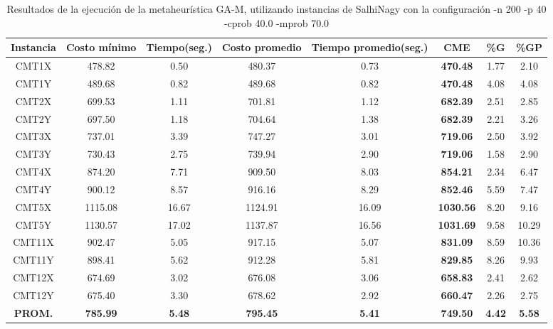 \begin{table}[h]
\caption{Resultados de la ejecución de la metaheurística GA-M, utilizando instancias de SalhiNagy con la configuración -n 200 -p 40 -cprob 40.0 -mprob 70.0}
\centering
\small
\begin{tabular}{c c c c c c c c}
\hline\hline
Instancia & Costo mínimo & Tiempo(seg.) & Costo promedio & Tiempo promedio(seg.) & CME & \%G & \%GP \\ [0.5ex]
\hline
CMT1X & 478.82 & 0.50 & 
480.37 & 0.73 & \bf{470.48} & 
1.77 & 2.10\\CMT1Y & 489.68 & 0.82 & 
489.68 & 0.82 & \bf{470.48} & 
4.08 & 4.08\\CMT2X & 699.53 & 1.11 & 
701.81 & 1.12 & \bf{682.39} & 
2.51 & 2.85\\CMT2Y & 697.50 & 1.18 & 
704.64 & 1.38 & \bf{682.39} & 
2.21 & 3.26\\CMT3X & 737.01 & 3.39 & 
747.27 & 3.01 & \bf{719.06} & 
2.50 & 3.92\\CMT3Y & 730.43 & 2.75 & 
739.94 & 2.90 & \bf{719.06} & 
1.58 & 2.90\\CMT4X & 874.20 & 7.71 & 
909.50 & 8.03 & \bf{854.21} & 
2.34 & 6.47\\CMT4Y & 900.12 & 8.57 & 
916.16 & 8.29 & \bf{852.46} & 
5.59 & 7.47\\CMT5X & 1115.08 & 16.67 & 
1124.91 & 16.09 & \bf{1030.56} & 
8.20 & 9.16\\CMT5Y & 1130.57 & 17.02 & 
1137.87 & 16.56 & \bf{1031.69} & 
9.58 & 10.29\\CMT11X & 902.47 & 5.05 & 
917.15 & 5.07 & \bf{831.09} & 
8.59 & 10.36\\CMT11Y & 898.41 & 5.62 & 
912.28 & 5.81 & \bf{829.85} & 
8.26 & 9.93\\CMT12X & 674.69 & 3.02 & 
676.08 & 3.06 & \bf{658.83} & 
2.41 & 2.62\\CMT12Y & 675.40 & 3.30 & 
678.62 & 2.92 & \bf{660.47} & 
2.26 & 2.75\\\bf{PROM.} & 
\bf{785.99} & \bf{5.48} & \bf{795.45} & \bf{5.41} & \bf{749.50} & \bf{4.42} & \bf{5.58}\\[1ex]\hline
\end{tabular}
\label{table:nonlin}
\end{table} 

